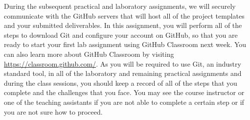 During the subsequent practical and  laboratory assignments, we will securely communicate
with the GitHub servers that will host all of the project templates and your submitted deliverables. In this assignment,
you will perform all of the steps to download Git and configure your account on GitHub, so that you are ready to start your first lab assignment using
GitHub Classroom next week.  You can
also learn more about GitHub Classroom by visiting \url{https://classroom.github.com/}. As you will be required to use
Git, an industry standard tool, in all of the  laboratory and remaining practical assignments and during the class
sessions, you should keep a record of all of the steps that you complete and the challenges that you face. You may see
the course instructor or one of the teaching assistants if you are not able to complete a certain step or if you are not
sure how to proceed.

